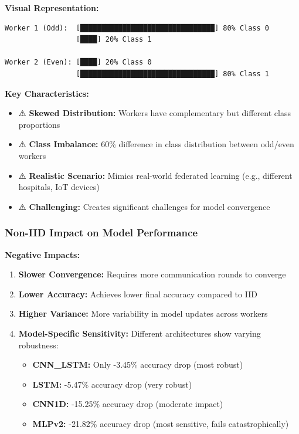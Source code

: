\documentclass[12pt,a4paper]{article}
\begin{document}
\textbf{Visual Representation:}
\begin{verbatim}
Worker 1 (Odd):  [████████████████████████████████] 80% Class 0
                 [████] 20% Class 1

Worker 2 (Even): [████] 20% Class 0
                 [████████████████████████████████] 80% Class 1
\end{verbatim}

\textbf{Key Characteristics:}
\begin{itemize}
    \item ⚠️ \textbf{Skewed Distribution:} Workers have complementary but different class proportions
    \item ⚠️ \textbf{Class Imbalance:} 60\% difference in class distribution between odd/even workers
    \item ⚠️ \textbf{Realistic Scenario:} Mimics real-world federated learning (e.g., different hospitals, IoT devices)
    \item ⚠️ \textbf{Challenging:} Creates significant challenges for model convergence
\end{itemize}

\subsubsection{Non-IID Impact on Model Performance}

\textbf{Negative Impacts:}
\begin{enumerate}
    \item \textbf{Slower Convergence:} Requires more communication rounds to converge
    \item \textbf{Lower Accuracy:} Achieves lower final accuracy compared to IID
    \item \textbf{Higher Variance:} More variability in model updates across workers
    \item \textbf{Model-Specific Sensitivity:} Different architectures show varying robustness:
    \begin{itemize}
        \item \textbf{CNN\_LSTM:} Only -3.45\% accuracy drop (most robust)
        \item \textbf{LSTM:} -5.47\% accuracy drop (very robust)
        \item \textbf{CNN1D:} -15.25\% accuracy drop (moderate impact)
        \item \textbf{MLPv2:} -21.82\% accuracy drop (most sensitive, fails catastrophically)
    \end{itemize}
\end{enumerate}
\end{document}
